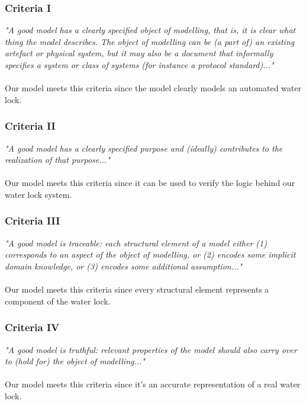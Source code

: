 \documentclass{article}
\begin{document}
        \subsubsection{Criteria I}
            \textit{"A good model has a clearly specified object of modelling, that is, it is clear what thing the model describes. The object of modelling can be (a part of) an existing artefact or physical system, but it may also be a document that informally specifies a system or class of systems (for instance a protocol standard)..."} \\\\
            Our model meets this criteria since the model clearly models an automated water lock.
        
        \subsubsection{Criteria II}
            \textit{"A good model has a clearly specified purpose and (ideally) contributes to the realization of that purpose..."} \\\\
            Our model meets this criteria since it can be used to verify the logic behind our water lock system.
         
        \subsubsection{Criteria III}
            \textit{"A good model is traceable: each structural element of a model either (1) corresponds to an aspect of the object of modelling, or (2) encodes some implicit domain knowledge, or (3) encodes some additional assumption..."} \\\\
            Our model meets this criteria since every structural element represents a component of  the water lock.
         
         \subsubsection{Criteria IV}
            \textit{"A good model is truthful: relevant properties of the model should also carry over to (hold for) the object of modelling..."}\\\\
            Our model meets this criteria since it's an accurate representation of a real water lock.
         
\end{document}
